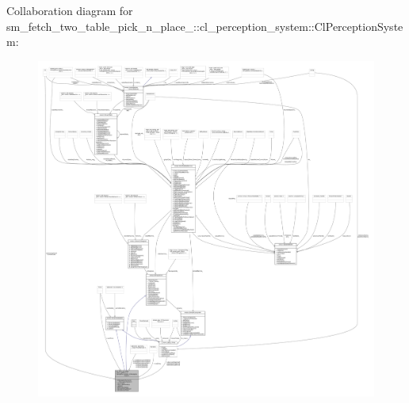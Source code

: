 Collaboration diagram for sm\+\_\+fetch\+\_\+two\+\_\+table\+\_\+pick\+\_\+n\+\_\+place\+\_\+:\+:cl\+\_\+perception\+\_\+system\+:\+:Cl\+Perception\+System\+:
\nopagebreak
\begin{figure}[H]
\begin{center}
\leavevmode
\includegraphics[width=350pt]{classsm__fetch__two__table__pick__n__place__1_1_1cl__perception__system_1_1ClPerceptionSystem__coll__graph}
\end{center}
\end{figure}
